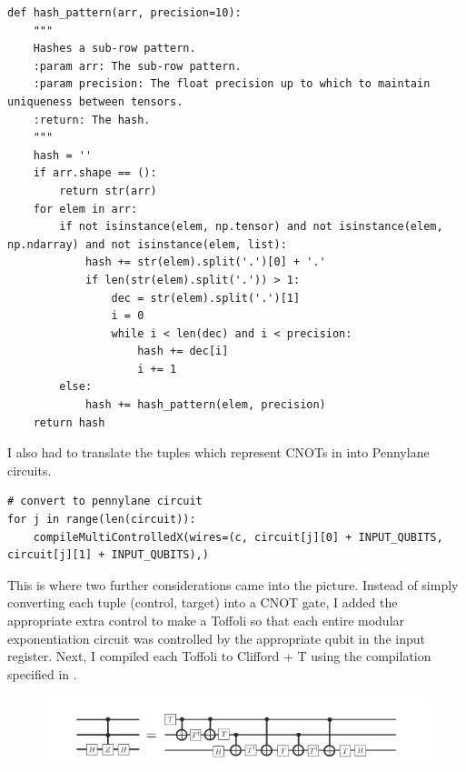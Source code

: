 \documentclass{article}
\begin{document}
\begin{lstlisting}
def hash_pattern(arr, precision=10):
    """
    Hashes a sub-row pattern.
    :param arr: The sub-row pattern.
    :param precision: The float precision up to which to maintain uniqueness between tensors.
    :return: The hash.
    """
    hash = ''
    if arr.shape == ():
        return str(arr)
    for elem in arr:
        if not isinstance(elem, np.tensor) and not isinstance(elem, np.ndarray) and not isinstance(elem, list):
            hash += str(elem).split('.')[0] + '.'
            if len(str(elem).split('.')) > 1:
                dec = str(elem).split('.')[1]
                i = 0
                while i < len(dec) and i < precision:
                    hash += dec[i]
                    i += 1
        else:
            hash += hash_pattern(elem, precision)
    return hash 
\end{lstlisting}

I also had to translate the tuples which represent CNOTs in \cite{patel_efficient_2003} into Pennylane circuits.

\begin{lstlisting}
# convert to pennylane circuit
for j in range(len(circuit)):
    compileMultiControlledX(wires=(c, circuit[j][0] + INPUT_QUBITS, circuit[j][1] + INPUT_QUBITS),)
\end{lstlisting}

This is where two further considerations came into the picture. Instead of simply converting each tuple (control, target) into a CNOT gate, I added the appropriate extra control to make a Toffoli so that each entire modular exponentiation circuit was controlled by the appropriate qubit in the input register. Next, I compiled each Toffoli to Clifford + T using the compilation specified in \cite{welch_efficient_2015}.

\begin{figure}[h!]
    \centering
    \includegraphics[width=1\linewidth]{circuit.png}
\end{figure}
\end{document}
